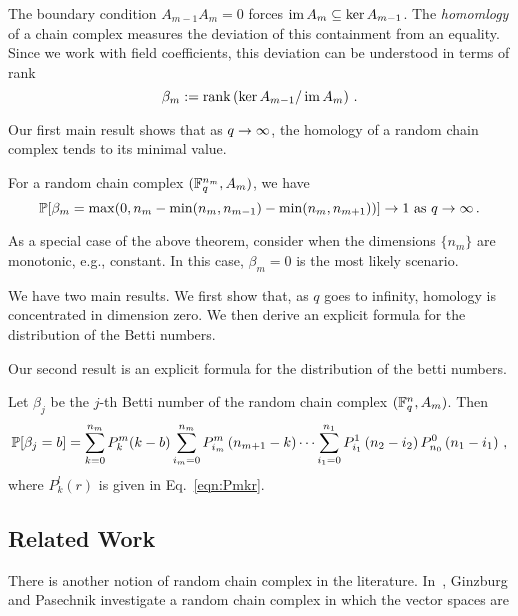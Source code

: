 The boundary condition $A_{m-1}A_m=0$ forces $\operatorname{\mathrm{im}} A_m \subseteq \ker A_{m-1}$.
The {\em homomlogy} of a chain complex measures the deviation of this containment
from an equality. Since we work with field coefficients, this deviation can
be understood in terms of rank
\begin{equation}
  \beta_m := \mathrm{rank} \left(\ker A_{m-1} / \operatorname{\mathrm{im}} A_m \right)\, .
  \label{eqn:betti_numbers}
\end{equation}

Our first main result shows that as $q \rightarrow \infty$, the homology of a 
random chain complex tends to its minimal value.

\begin{theorem}
  For a random chain complex $(\mathbb{F}_q^{n_m},A_m)$, we have
  \[
    \mathbb{P}[\beta_m = \max(0,n_m - \min(n_{m},n_{m-1}) - \min(n_m,n_{m+1}))] \rightarrow 1 
    \mbox{ as } q \rightarrow \infty  \, .
  \]
\end{theorem}

As a special case of the above theorem, consider when the dimensions $\{n_m\}$
are monotonic, e.g., constant. In this case, 
$\beta_m = 0$ is the most likely scenario.

We have two main results. We first show that, as $q$ goes to infinity, homology
is concentrated in dimension zero.  We then derive an explicit formula for the
distribution of the Betti numbers.

Our second result is an explicit formula for the distribution
of the betti numbers.
\begin{theorem} Let $\beta_j$ be the $j$-th Betti number of the random chain complex $(\mathbb{F}_q^{n} , A_m)$. Then
	\[    
    \mathbb{P}[\beta_j = b] = \sum_{k=0}^{n_{m}} P_{k}^{m}(k-b)\sum_{i_m=0}^{n_m} P_{i_m}^{m}\left(n_{m+1} -k\right)
		\cdots
		\sum_{i_1 = 0}^{n_1} P_{i_1}^1\left(n_2 - i_2\right) P_{n_0}^0 \left(n_1 - i_1\right) \, ,
    \]
    where $P^l_k(r)$ is given in Eq.~\eqref{eqn:Pmkr}.
\end{theorem}



\subsection*{Related Work} There is another notion of random chain complex in the 
literature. In~\cite{ginzburg2017random}, Ginzburg and Pasechnik investigate
a random chain complex in which the vector spaces are 
